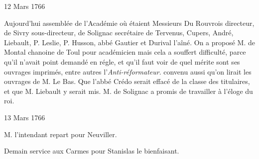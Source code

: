                      \begin{diary}{12 Mars 1766}{}
                        
                         Aujourd'hui assemblée de l'Académie
                           où étaient Messieurs
                           Du Rouvrois directeur,
                           de Sivry
                           sous-directeur, de Solignac
                           secrétaire
                           de Tervenus, Cupers, André, Liebault,
                           P. Leslie, P. Husson, abbé
                              Gautier et
                           Durival l'aîné. On a proposé
                              M. de
                              Montal chanoine de Toul pour académicien
                           mais cela a souffert difficulté, parce qu'il
                           n'avait point demandé en régle, et qu'il
                           faut voir de quel mérite sont ses ouvrages
                           imprimés, entre autres l'\emph{Anti-réformateur}.
                           convenu aussi qu'on lirait les ouvrages de
                           M. Le Bas. Que l'abbé Crédo serait effacé de la classe des titulaires, et que M. Liebault
                           y serait mis. M. de Solignac
                           a promis
                           de travailler à l'éloge du roi.
                        \bigskip
        
        
                     \end{diary}
                     \begin{diary}{13 Mars 1766}{}
                        
                        
                           M. l'intendant repart pour
                              Neuviller. \bigskip
        
        
                         Demain service aux Carmes pour
                           Stanislas le bienfaisant. \bigskip
        
        
                     \end{diary}

